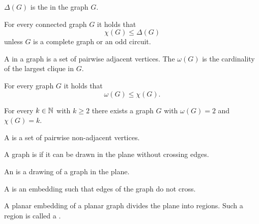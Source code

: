 \begin{definition}
    $\Delta (G)$ is the  in the graph $G$.
\end{definition}

\begin{theorem}[Brooks]
    For every connected graph $G$ it holds that
    \[
        \chi (G) \le \Delta (G)
    \]
    unless $G$ is a complete graph or an odd circuit.
\end{theorem}

\begin{definition}
    A  in a graph is a set of pairwise adjacent vertices.
    The  $\omega (G)$ is the cardinality of the largest clique in $G$.
\end{definition}

\begin{theorem}
    For every graph $G$ it holds that
    \[
        \omega (G) \le \chi(G).
    \]
\end{theorem}

\begin{theorem}[Mycielski]
    For every $k \in \mathbb{N} $ with $k \ge 2$ there exists a graph $G$ with $\omega(G) = 2$ and $\chi(G) = k$.
\end{theorem}

\begin{definition}
    A  is a set of pairwise non-adjacent vertices.
\end{definition}

\begin{definition}
    A graph is  if it can be drawn in the plane without crossing edges.
\end{definition}

\begin{definition}
    An  is a drawing of a graph in the plane.
\end{definition}

\begin{definition}
    A  is an embedding such that edges of the graph do not cross.
\end{definition}

\begin{definition}
    A planar embedding of a planar graph divides the plane into regions.
    Such a region is called a .
\end{definition}

